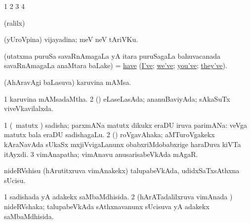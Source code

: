 \bentry 
{}
\gl{\saMkiSx}
\expl{}
\bmng
\bnum
\num{1}  
\num{2}  
\num{3}  
\num{4}  
\enum
\emng
\eentry

\bentry
{}
\gl{\saMkiSx}
\expl{}
\bmng
\emng
\eentry

\bentry
{}
\gl{\saMkiSx}
\expl{}
\bmng
{} 
\emng
\eentry

\bentry
{}
\gl{\saMkiSx}
\expl{}
\bmng
\emng
\eentry

\bentry
{}
\gl{\saMkiSx}
\expl{}
\bmng
(ralilx)  
\emng
\eentry

\bentry
{}
\gl{\nA}
\expl{}
\bmng
(yUroVpina) vijayadina; meV neV tAriVKu. 
\emng
\eentry

\bentry
{} 
\gl{\saMkiSx}
\expl{}
\bmng
 (utatxma puruSa savaRnAmagaLa yA itara puruSagaLa bahuvacanada savaRnAmagaLa anaMtara baLake) = \hyperref{kandict_h.pdf}{H}{have(1)}{have} (\hyperref{kandict_i.pdf}{I}{I've}{I've}; \hyperref{kandict_w.pdf}{W}{we've}{we've}; \hyperref{kandict_y.pdf}{Y}{you've}{you've}; \hyperref{kandict_t.pdf}{T}{they've}{they've}). 
\emng
\eentry

\bentry
{} 
\gl{\nA}
\expl{}
\bmng
 (AhAravAgi baLasuva) karuvina mAMsa. 
\emng
\eentry

\bentry
{} 
\gl{}
\expl{}
\bmng
\bnum
\num{1} karuvina mAMsadaMtha. 
\num{2} (\rUpa) eLaseLasAda; ananuBaviyAda; sAkaSuTx viveVkavilalxda. 
\enum
\emng
\eentry

\bentry
{} 
\gl{\nA}
\expl{}
\bmng
\bnum
\num{1} (\Bwvi\ matutx \ga) sadisha; parxmANa matutx dikukx eraDU iruva parimANa:  veVga matutx bala eraDU sadishagaLu. 
\num{2} (\veYshA) roVgavAhaka; aMTuroVgakekx kAraNavAda sUkaSx mxjiVvigaLanunx obabxriMdobabxrige haraDuva kiVTa itAyxdi. 
\num{3} vimAnapatha; vimAnavu anusarisabeVkAda mAgaR. 
\enum
\emng
\eentry

\bentry
{} 
\gl{\sakirx}
\expl{}
\bmng
 nideRVshisu (hArutitxruva vimAnakekx) talupabeVkAda, udidxSaTxsAthxna sUcisu. 
\emng
\eentry

\bentry
{} 
\gl{\gu}
\expl{}
\bmng
\bnum
\num{1} sadishada yA adakekx saMbaMdhisida. 
\num{2} (hArATadalilxruva vimAnada \vi) nideRVshaka; talupabeVkAda sAthxnavanunx sUcisuva yA adakekx saMbaMdhisida. 
\enum
\emng
\eentry

